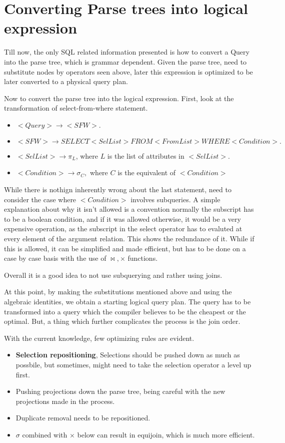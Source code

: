 \section{Converting Parse trees into logical expression}
Till now, the only SQL related information presented is how to convert a Query into the parse tree, which is grammar dependent. Given the parse tree, need to substitute nodes by operators seen above, later this expression is optimized to be later converted to a physical query plan.
\par Now to convert the parse tree into the logical expression. First, look at the transformation of select-from-where statement.
\begin{itemize}
    \item $<Query> \rightarrow <SFW>.$
    \item $<SFW> \rightarrow SELECT <SelList> FROM <FromList> WHERE <Condition>.$
    \item $<SelList> \rightarrow \pi_{L}$, where $L$ is the list of attributes in $<SelList>.$
    \item $<Condition> \rightarrow \sigma_{C},$ where $C$ is the equivalent of $<Condition>$ 
\end{itemize}
While there is nothign inherently wrong about the last statement, need to consider the case where $<Condition>$ involves subqueries. A simple explanation about why it isn't allowed is a convention normally the subscript has to be a boolean condition, and if it was allowed otherwise, it would be a very expensive operation, as the subscript in the select operator has to evaluted at every element of the argument relation. This shows the redundance of it. While if this is allowed, it can be simplified and made efficient, but has to be done on a case by case basis with the use of $\bowtie, \times$ functions.
\par Overall it is a good idea to not use subquerying and rather using joins.
\par At this point, by making the substitutions mentioned above and using the algebraic identities, we obtain a starting logical query plan. The query has to be transformed into a query which the compiler believes to be the cheapest or the optimal. But, a thing which further complicates the process is the join order.
\par With the current knowledge, few optimizing rules are evident.
\begin{itemize}
    \item \textbf{Selection repositioning}, Selections should be pushed down as much as possbile, but sometimes, might need to take the selection operator a level up first.
    \item Pushing projections down the parse tree, being careful with the new projections made in the process.
    \item Duplicate removal needs to be repositioned.
    \item $\sigma$ combined with $\times$ below can result in equijoin, which is much more efficient. 
\end{itemize}
